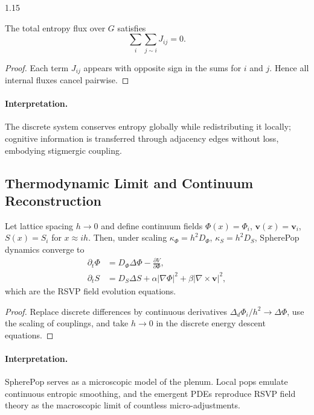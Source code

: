\documentclass[12pt,a4paper]{article}
\begin{document}
\begin{spacing}{1.15}
\begin{proposition}
\label{prop:cons}
The total entropy flux over $G$ satisfies
\[
  \sum_i \sum_{j\sim i} J_{ij} = 0.
\]
\end{proposition}

\begin{proof}
Each term $J_{ij}$ appears with opposite sign in the sums for $i$ and $j$.
Hence all internal fluxes cancel pairwise.
\end{proof}

\paragraph{Interpretation.}
The discrete system conserves entropy globally while
redistributing it locally; cognitive information is transferred
through adjacency edges without loss, embodying stigmergic coupling.

\subsection{Thermodynamic Limit and Continuum Reconstruction}

\begin{theorem}
\label{thm:continuum}
Let lattice spacing $h\to0$ and define continuum fields
$\Phi(x)=\Phi_i$, $\mathbf{v}(x)=\mathbf{v}_i$, $S(x)=S_i$
for $x\approx i h$.
Then, under scaling
$\kappa_\Phi=h^2 D_\Phi$, $\kappa_S=h^2 D_S$,
SpherePop dynamics converge to
\[
\begin{aligned}
  \partial_t \Phi &= D_\Phi \Delta \Phi - \frac{\partial V}{\partial\Phi},\\
  \partial_t S    &= D_S \Delta S + \alpha|\nabla\Phi|^2 + \beta|\nabla\times\mathbf{v}|^2,
\end{aligned}
\]
which are the RSVP field evolution equations.
\end{theorem}

\begin{proof}
Replace discrete differences by continuous derivatives
$\Delta_d\Phi_i/h^2\!\to\!\Delta\Phi$,
use the scaling of couplings,
and take $h\to0$ in the discrete energy descent equations.
\end{proof}

\paragraph{Interpretation.}
SpherePop serves as a microscopic model of the plenum.
Local pops emulate continuous entropic smoothing,
and the emergent PDEs reproduce RSVP field theory
as the macroscopic limit of countless micro-adjustments.


\end{spacing}
\end{document}
